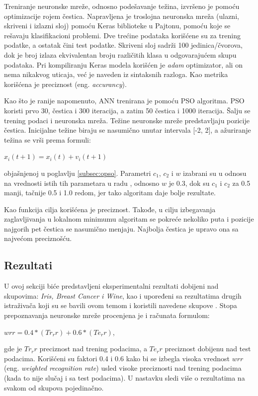 \documentclass[a4paper]{article}
\begin{document}
Treniranje neuronske mreže, odnosno podešavanje težina, izvršeno je pomoću optimizacije rojem čestica. 
Napravljena je troslojna neuronska mreža (ulazni, skriveni i izlazni sloj) pomoću Keras biblioteke u Pajtonu, pomoću koje se rešavaju klasifikacioni problemi. 
Dve trećine podataka korišćene su za trening podatke, a ostatak čini test podatke. Skriveni sloj sadrži 100 jedinica/čvorova, dok je broj izlaza 
ekvivalentan broju različitih klasa u odgovarajućem skupu podataka. Pri kompiliranju Keras modela korišćen je \textit{adam} optimizator,
ali on nema nikakvog uticaja, već je naveden iz sintaksnih razloga. Kao metrika korišćena je preciznost (eng. \emph{accurancy}). 

Kao što je ranije napomenuto, ANN trenirana je pomoću PSO algoritma. PSO koristi prvo 30, čestica i 300 iteracija, a zatim 50 čestica i 1000 iteracija. 
Šalju se trening podaci i neuronska mreža. Težine neuronske mreže predstavljaju pozicije čestica. Inicijalne težine biraju se nasumično unutar intervala [-2, 2],
a ažuriranje težina se vrši prema formuli: 

\begin{center}
{$x_i(t+1) = x_i(t) + v_i(t+1)$}
\end{center}
objašnjenoj u poglavlju \ref{subsec:opso}. Parametri $c_1$, $c_2$ i $w$ izabrani su u odnosu na vrednosti istih tih parametara u radu \cite{hindawi},
odnosno $w$ je 0.3, dok su $c_1$ i $c_2$ za 0.5 manji, tačnije 0.5 i 1.0 redom, jer tako algoritam daje bolje rezultate. 

Kao funkcija cilja korišćena je preciznost. Takođe, u cilju izbegavanja zaglavljivanja u lokalnom minimumu algoritam se pokreće 
nekoliko puta i pozicije najgorih pet čestica se nasumično menjaju. Najbolja čestica je upravo ona sa najvećom preciznošću.

\subsection{Rezultati}
\label{rezultati}

U ovoj sekciji biće predstavljeni eksperimentalni rezultati dobijeni nad skupovima: \textit{Iris, Breast Cancer i Wine}, kao i upoređeni sa
rezultatima drugih istraživača koji su se bavili ovom temom i koristili navedene skupove \cite{hindawi}. Stopa prepoznavanja neuronske
mreže procenjena je i računata formulom:

\begin{center}
{$wrr = 0.4*(Tr_r r) + 0.6*(Te_r r)$}, 
\end{center}
gde je $Tr_r r$ preciznost nad trening podacima, a $Te_r r$ preciznost dobijenu nad test podacima. Korišćeni su faktori 0.4 i 0.6 
kako bi se izbegla visoka vrednost $wrr$ (eng. \emph{weighted recognition rate}) usled visoke preciznosti nad trening podacima 
(kada to nije slučaj i sa test podacima). U nastavku sledi više o rezultatima na svakom od skupova pojedinačno.
\end{document}
